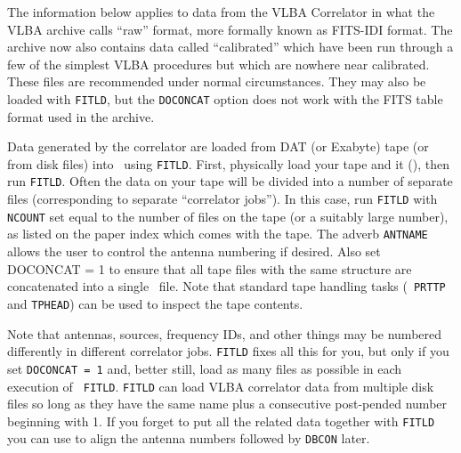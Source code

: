 

The information below applies to data from the VLBA Correlator in what
the VLBA archive calls ``raw'' format, more formally known as FITS-IDI
format.  The archive now also contains data called ``calibrated''
which have been run through a few of the simplest VLBA procedures but
which are nowhere near calibrated.  These files are recommended under
normal circumstances.  They may also be loaded with {\tt FITLD}, but
the {\tt DOCONCAT} option does not work with the FITS table format
used in the archive.

Data generated by the  correlator are loaded from DAT (or
Exabyte) tape (or from disk files) into \AIPS\ using {\tt FITLD}\@.
First, physically load your tape and {\tt {}} it
(), then run {\tt FITLD}\@.  Often the data on your tape
will be divided into a number of separate files (corresponding to
separate ``correlator jobs'').  In this case, run {\tt FITLD} with
{\tt NCOUNT} set equal to the number of files on the tape (or a
suitably large number), as listed on the paper index which comes with
the tape.  The adverb {\tt ANTNAME} allows the
user to control the antenna numbering if desired.  Also set {\us
DOCONCAT = 1 \CR} to ensure that all tape files with the same
structure are concatenated into a single \AIPS\ file.  Note that
standard tape handling tasks (\eg\ {\tt PRTTP} and {\tt TPHEAD}) can
be used to inspect the tape contents.

Note that antennas, sources, frequency IDs, and other things may be
numbered differently in different correlator jobs.  {\tt FITLD} fixes
all this for you, but only if you set {\tt DOCONCAT = 1} and, better
still, load as many files as possible in each execution of {\tt
FITLD}\@.  {\tt FITLD} can load VLBA correlator data from multiple disk
files so long as they have the same name plus a consecutive
post-pended number beginning with 1.  If you forget to put all the
related data together with {\tt FITLD} you can use {\tt {}}
to align the antenna numbers followed by {\tt DBCON} later.

